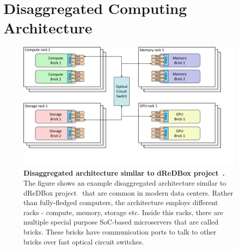 \section{Disaggregated Computing Architecture}
\label{ch:background:disaggregated}



\begin{figure}[t]
  \centering
    \includegraphics[trim={0 2cm 2cm 0},clip,width=\linewidth]{chapters/background/figures/disaggregated.pdf}
    \caption[Disaggregated architecture similar to dReDBox project]{\textbf{Disaggregated architecture similar to dReDBox project~\cite{dis1}.} The figure shows an example disaggregated architecture similar to dReDBox project~\cite{dis1} that are common in modern data centers. Rather than fully-fledged computers, the architecture employs different racks - compute, memory, storage etc. Inside this racks, there are multiple special purpose SoC-based microservers that are called bricks. These bricks have communication ports to talk to other bricks over fast optical circuit switches.}
    \label{fig:disagg_bg}
\end{figure}



